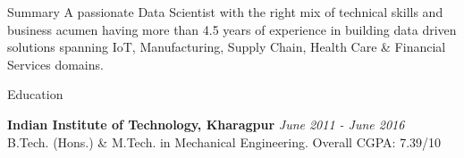 \documentclass{resume}
\begin{document}
\begin{rSection}{Summary}
A passionate Data Scientist with the right mix of technical skills and business acumen having more than 4.5 years of experience in building data driven solutions spanning IoT, Manufacturing, Supply Chain, Health Care \& Financial Services domains.
\end{rSection}

\begin{rSection}{Education}

{\bf Indian Institute of Technology, Kharagpur} \hfill {\em June 2011 - June 2016} 
\\ B.Tech. (Hons.) \& M.Tech. in Mechanical Engineering.\hfill { Overall CGPA: 7.39/10}

\end{rSection}
\end{document}
